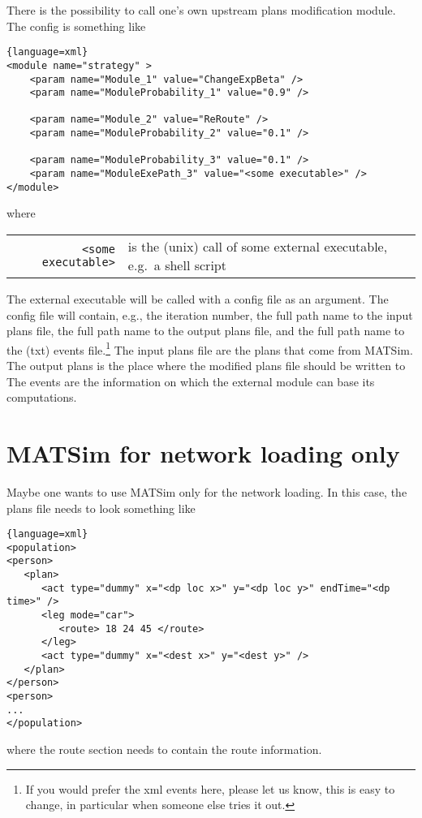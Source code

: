 There is the possibility to call one's own upstream plans modification module.  The config is something like
\begin{lstlisting}{language=xml}
<module name="strategy" >
	<param name="Module_1" value="ChangeExpBeta" />
	<param name="ModuleProbability_1" value="0.9" />

	<param name="Module_2" value="ReRoute" />
	<param name="ModuleProbability_2" value="0.1" />

	<param name="ModuleProbability_3" value="0.1" />
	<param name="ModuleExePath_3" value="<some executable>" />
</module>
\end{lstlisting}
where

\begin{tabularx}{\hsize}{rX}
\verb$<some executable>$ & is the (unix) call of some external executable, e.g.\ a shell script \\
\end{tabularx}

The external executable will be called with a config file as an argument.  The config file will contain, e.g., the iteration number, the full path name to the input plans file, the full path name to the output plans file, and the full path name to the (txt) events file.\footnote{%
%
If you would prefer the xml events here, please let us know, this is easy to change, in particular when someone else tries it out.
%
}
The input plans file are the plans that come from MATSim.  The output plans is the place where the modified plans file should be written to  The events are the information on which the external module can base its computations.

\section{MATSim for network loading only}

Maybe one wants to use MATSim only for the network loading.  In this case, the plans file needs to look something like
\begin{lstlisting}{language=xml}
<population>
<person>
   <plan>
      <act type="dummy" x="<dp loc x>" y="<dp loc y>" endTime="<dp time>" />
      <leg mode="car">
         <route> 18 24 45 </route>
      </leg>
      <act type="dummy" x="<dest x>" y="<dest y>" />
   </plan>
</person>
<person>
...
</population>
\end{lstlisting}
where the route section needs to contain the route information. 

